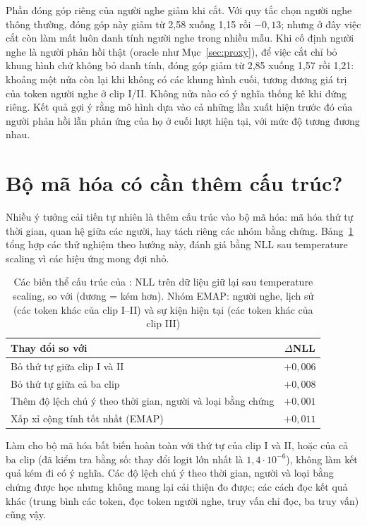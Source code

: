 Phần đóng góp riêng của người nghe giảm khi cắt. Với quy tắc chọn người nghe thông thường, đóng góp này giảm từ 2,58 xuống 1,15 rồi $-0{,}13$; nhưng ở đây việc cắt còn làm mất luôn danh tính người nghe trong nhiều mẫu. Khi cố định người nghe là người phản hồi thật (oracle như Mục~\ref{sec:proxy}), để việc cắt chỉ bỏ khung hình chứ không bỏ danh tính, đóng góp giảm từ 2,85 xuống 1,57 rồi 1,21: khoảng một nửa còn lại khi không có các khung hình cuối, tương đương giá trị của token người nghe ở clip I/II. Không nửa nào có ý nghĩa thống kê khi đứng riêng. Kết quả gợi ý rằng mô hình dựa vào cả những lần xuất hiện trước đó của người phản hồi lẫn phản ứng của họ ở cuối lượt hiện tại, với mức độ tương đương nhau.

\section{Bộ mã hóa có cần thêm cấu trúc?}
\label{sec:structure}

Nhiều ý tưởng cải tiến tự nhiên là thêm cấu trúc vào bộ mã hóa: mã hóa thứ tự thời gian, quan hệ giữa các người, hay tách riêng các nhóm bằng chứng. Bảng~\ref{tab:structure} tổng hợp các thử nghiệm theo hướng này, đánh giá bằng NLL sau temperature scaling vì các hiệu ứng mong đợi nhỏ.

\begin{table}[!htb]
\centering
\caption{Các biến thể cấu trúc của \model{}: NLL trên dữ liệu giữ lại sau temperature scaling, so với \model{} (dương = kém hơn). Nhóm EMAP: người nghe, lịch sử (các token khác của clip I--II) và sự kiện hiện tại (các token khác của clip III)}
\label{tab:structure}
\begin{tabular}{lc}
\toprule
Thay đổi so với \model{} & $\Delta$NLL \\
\midrule
Bỏ thứ tự giữa clip I và II & $+0{,}006$ \\
Bỏ thứ tự giữa cả ba clip & $+0{,}008$ \\
Thêm độ lệch chú ý theo thời gian, người và loại bằng chứng & $+0{,}001$ \\
Xấp xỉ cộng tính tốt nhất (EMAP) & $+0{,}011$ \\
\bottomrule
\end{tabular}
\end{table}

Làm cho bộ mã hóa bất biến hoàn toàn với thứ tự của clip I và II, hoặc của cả ba clip (đã kiểm tra bằng số: thay đổi logit lớn nhất là $1{,}4\cdot10^{-6}$), không làm kết quả kém đi có ý nghĩa. Các độ lệch chú ý theo thời gian, người và loại bằng chứng được học nhưng không mang lại cải thiện đo được; các cách đọc kết quả khác (trung bình các token, đọc token người nghe, truy vấn chỉ đọc, ba truy vấn) cũng vậy.

